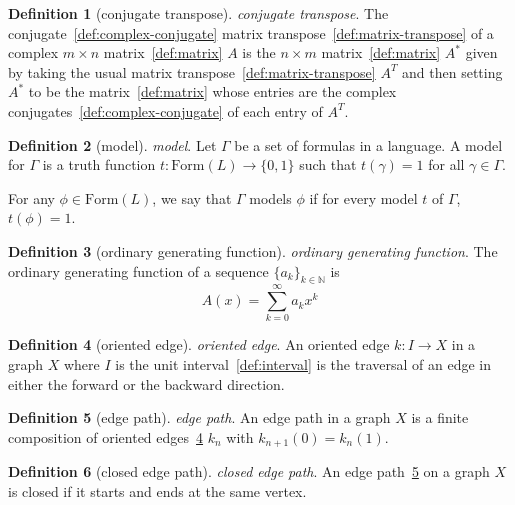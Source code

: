 \documentclass[12pt,a4paper]{article}
\theoremstyle{definition}
\newtheorem{definition}{Definition}
\begin{document}
\begin{definition}[conjugate transpose]\label{def:conjugate-transpose}
\emph{conjugate transpose}. The conjugate~\ref{def:complex-conjugate} matrix transpose~\ref{def:matrix-transpose} of a complex $m\times n$ matrix~\ref{def:matrix} $A$ is the $n \times m$ matrix~\ref{def:matrix} $A^*$ given by taking the usual matrix transpose~\ref{def:matrix-transpose} $A^T$ and then setting $A^*$ to be the matrix~\ref{def:matrix} whose entries are the complex conjugates~\ref{def:complex-conjugate} of each entry of $A^T$.
\end{definition}

\begin{definition}[model]\label{def:model}
\emph{model}. Let $\Gamma$ be a set of formulas in a language. A model for $\Gamma$ is a truth function $t:\text{Form}(L) \to \{0,1\}$ such that $t(\gamma) = 1$ for all $\gamma\in \Gamma$. 

For any $\phi \in \text{Form}(L)$, we say that $\Gamma$ models $\phi$ if for every model $t$ of $\Gamma$, $t(\phi) = 1$.
\end{definition}

\begin{definition}[ordinary generating function]\label{def:ordinary-generating-function}
\emph{ordinary generating function}. The ordinary generating function of a sequence $\{a_k\}_{k\in\mathbb N}$ is $$A(x) = \sum_{k=0}^\infty a_kx^k$$
\end{definition}

\begin{definition}[oriented edge]\label{def:oriented-edge}
\emph{oriented edge}. An oriented edge $k:I\to X$ in a graph $X$ where $I$ is the unit interval~\ref{def:interval} is the traversal of an edge in either the forward or the backward direction.
\end{definition}

\begin{definition}[edge path]\label{def:edge-path}
\emph{edge path}. An edge path in a graph $X$ is a finite composition of oriented edges~\ref{def:oriented-edge} $k_n$ with $k_{n+1}(0) = k_n(1)$.
\end{definition}

\begin{definition}[closed edge path]\label{def:closed-edge-path}
\emph{closed edge path}. An edge path~\ref{def:edge-path} on a graph $X$ is closed if it starts and ends at the same vertex.
\end{definition}
\end{document}
